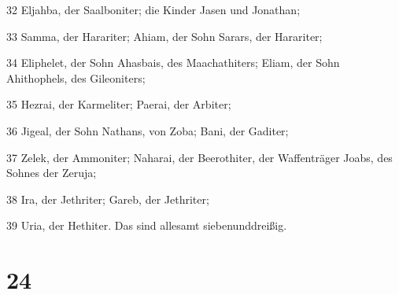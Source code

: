 \par 32 Eljahba, der Saalboniter; die Kinder Jasen und Jonathan;
\par 33 Samma, der Harariter; Ahiam, der Sohn Sarars, der Harariter;
\par 34 Eliphelet, der Sohn Ahasbais, des Maachathiters; Eliam, der Sohn Ahithophels, des Gileoniters;
\par 35 Hezrai, der Karmeliter; Paerai, der Arbiter;
\par 36 Jigeal, der Sohn Nathans, von Zoba; Bani, der Gaditer;
\par 37 Zelek, der Ammoniter; Naharai, der Beerothiter, der Waffenträger Joabs, des Sohnes der Zeruja;
\par 38 Ira, der Jethriter; Gareb, der Jethriter;
\par 39 Uria, der Hethiter. Das sind allesamt siebenunddreißig.

\chapter{24}

